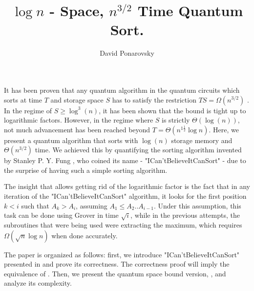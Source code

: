 \documentclass[manuscript,screen,review]{acmart}
\begin{document}


\title{$\log n$ - Space, $n^{3/2}$ Time Quantum Sort.} 
\author{David Ponarovsky}
\maketitle

It has been proven that any quantum algorithm in the quantum circuits which sorts at time $T$ and storage space $S$ has to satisfy the restriction $TS = \Omega(n^{3/2})$ \cite{klauck2003quantum}. In the regime of $S \ge \log^{3}(n)$, it has been shown that the bound is tight up to logarithmic factors. However, in the regime where $S$ is strictly $\Theta(\log(n))$, not much advancement has been reached beyond $T = \Theta( n^{1 \frac{1}{2}} \log n )$. Here, we present a quantum algorithm that sorts with $\log(n)$ storage memory and $ \Theta(n^{3/2})$ time. We achieved this by quantifying the sorting algorithm invented by Stanley P. Y. Fung \cite{Simplesort}, who coined its name - "ICan'tBelieveItCanSort" - due to the surprise of having such a simple sorting algorithm.

The insight that allows getting rid of the logarithmic factor is the fact that in any iteration of the "ICan'tBelieveItCanSort" algorithm, it looks for the first position $k < i$ such that $A_{k} > A_{i}$, assuming $A_{1}\le A_{2} .. A_{i-1}$. Under this assumption, this task can be done using Grover in time $\sqrt{i}$, while in the previous attempts, the subroutines that were being used were extracting the maximum, which requires $\Omega(\sqrt{n} \log n)$ when done accurately. 

The paper is organized as follows: first, we introduce "ICan'tBelieveItCanSort" presented in  and prove its correctness. The correctness proof will imply the equivalence of . Then, we present the quantum space bound version, , and analyze its complexity.
\end{document}
